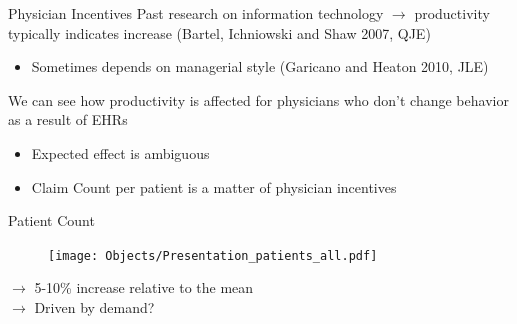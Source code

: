 \documentclass[10pt]{beamer}
\begin{document}
\begin{frame}{Physician Incentives}
Past research on information technology $\rightarrow$ productivity typically indicates increase \tiny (Bartel, Ichniowski and Shaw 2007, QJE)
\vspace{3mm}
\begin{itemize}
    \normalsize \item Sometimes depends on managerial style \tiny(Garicano and Heaton 2010, JLE)
\end{itemize}

\vspace{6mm}

\normalsize We can see how productivity is affected for physicians who don't change behavior as a result of EHRs
\vspace{3mm}
    \begin{itemize}
        \item Expected effect is ambiguous
        \vspace{3mm}
        \item Claim Count per patient is a matter of physician incentives
    \end{itemize}
\end{frame}

\begin{frame}{Patient Count}
\begin{figure}[ht]
    \centering
    \texttt{[image: Objects/Presentation\_patients\_all.pdf]}
\end{figure}
$\rightarrow$ 5-10\% increase relative to the mean\\
$\rightarrow$ Driven by demand? 
\end{frame}
\end{document}
